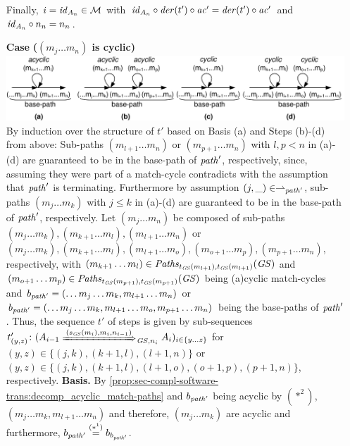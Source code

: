\begin{enumerate}
  Finally, $i=\mathit{id}_{A_n} \in {\cal M}$ with $\mathit{id}_{A_n} \circ \mathit{der}(t') \circ \mathit{ac}'=\mathit{der}(t') \circ \mathit{ac}'$ and $\mathit{id}_{A_n} \circ n_n=n_n$.
  \item[\textbf{Case}] \textbf{($(m_j\ldots m_n)$ is cyclic)}\newline
  \includegraphics[width=.95\textwidth]{img/software_trans/proof3.pdf}
  By induction over the structure of $t'$ based on Basis (a) and Steps (b)-(d) from above:
  Sub-paths $(m_{l+1}\ldots m_n)$ or $(m_{p+1}\ldots m_n)$ with $l,p < n$ in (a)-(d) are guaranteed to be in the base-path of $\mathit{path}'$, respectively, since, assuming they were part of a match-cycle contradicts with the assumption that $\mathit{path}'$ is terminating.
  Furthermore by assumption $(j,\_) \in \rightharpoonup_{\mathit{path}'}$, sub-paths $(m_j\ldots m_k)$ with $j \leq k$ in (a)-(d) are guaranteed to be in the base-path of $\mathit{path}'$, respectively.
  Let $(m_j\ldots m_n)$ be composed of sub-paths $(m_j\ldots m_k),(m_{k+1}\ldots m_l),(m_{l+1}\ldots m_n)$ or $(m_j\ldots m_k),(m_{k+1}\ldots m_l),(m_{l+1}\ldots m_o),(m_{o+1}\ldots m_p),(m_{p+1}\ldots m_n)$, respectively, with $(m_{k+1}\ldots m_l) \in \mathit{Paths}_{t_\mathit{GS}(m_{l+1}),t_\mathit{GS}(m_{l+1})}(\mathit{GS})$ and $(m_{o+1}\ldots m_p) \in \mathit{Paths}_{t_\mathit{GS}(m_{p+1}),t_\mathit{GS}(m_{p+1})}(\mathit{GS})$ being (a)cyclic match-cycles and $b_{\mathit{path}'}=(\ldots m_j\ldots m_k,m_{l+1}\ldots m_n)$ or $b_{\mathit{path}'}=(\ldots m_j\ldots m_k,m_{l+1}\ldots m_o,m_{p+1}\ldots m_n)$ being the base-paths of $\mathit{path}'$.
  Thus, the sequence $t'$ of steps is given by sub-sequences $t'_{(y,z)}\colon (A_{i-1} \Trans{(s_\GS(m_i),m_i,n_{i-1})}_{\GS,n_i} A_i)_{i \in \{y\ldots z\}}$ for $(y,z) \in \{(j,k),(k+1,l),(l+1,n)\}$ or $(y,z) \in \{(j,k),(k+1,l),(l+1,o),(o+1,p),(p+1,n)\}$, respectively.
  \textbf{Basis.} 
  By \cref{prop:sec-compl-software-trans:decomp_acyclic_match-paths} and $b_{\mathit{path}'}$ being acyclic by $(*^2)$, $(m_j\ldots m_k,m_{l+1}\ldots m_n)$ and therefore, $(m_j\ldots m_k)$ are acyclic and furthermore, $b_{\mathit{path}'}\stackrel{(*^1)}{=} b_{b_{\mathit{path}'}}$.

\end{enumerate}
